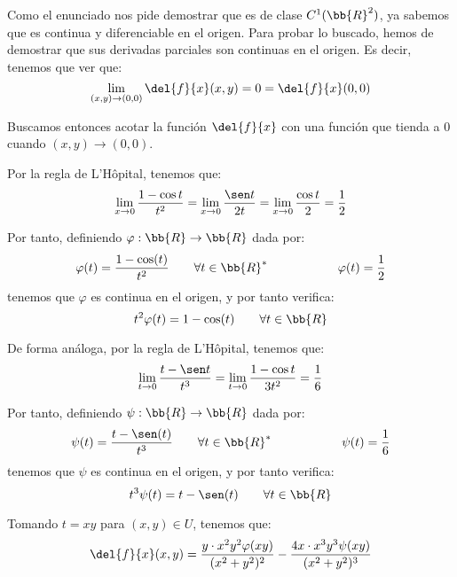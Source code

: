 \begin{ejercicio}
    Como el enunciado nos pide demostrar que es de clase $C^1(\bb{R}^2)$, ya sabemos que es continua y diferenciable en el origen. Para probar lo buscado, hemos de demostrar que sus derivadas parciales son continuas en el origen. Es decir,
    tenemos que ver que:
    \begin{equation*}
        \lim_{(x,y)\to (0,0)} \del{f}{x}(x,y) = 0 = \del{f}{x}(0,0)
    \end{equation*}

    Buscamos entonces acotar la función $\del{f}{x}$ con una función que tienda a $0$ cuando $(x,y)\to (0,0)$.

    Por la regla de L'Hôpital, tenemos que:
    \begin{equation*}
        \lim_{x\to 0} \frac{1-\cos t}{t^2}
        = \lim_{x\to 0} \frac{\sen t}{2t}
        = \lim_{x\to 0} \frac{\cos t}{2} = \frac{1}{2}
    \end{equation*}

    Por tanto, definiendo $\varphi:\bb{R} \to \bb{R}$ dada por:
    \begin{equation*}
        \varphi(t) = \frac{1-\cos(t)}{t^2} \qquad \forall t\in \bb{R}^\ast \hspace{2cm} \varphi(t) = \frac{1}{2}
    \end{equation*}
    tenemos que $\varphi$ es continua en el origen, y por tanto verifica:
    \begin{equation*}
        t^2\varphi(t) = 1-\cos(t) \qquad \forall t\in \bb{R}
    \end{equation*}

    De forma análoga, por la regla de L'Hôpital, tenemos que:
    \begin{equation*}
        \lim_{t\to 0} \frac{t-\sen t}{t^3}
        = \lim_{t\to 0} \frac{1-\cos t}{3t^2} = \frac{1}{6}
    \end{equation*}

    Por tanto, definiendo $\psi:\bb{R} \to \bb{R}$ dada por:
    \begin{equation*}
        \psi(t) = \frac{t-\sen(t)}{t^3} \qquad \forall t\in \bb{R}^\ast \hspace{2cm} \psi(t) = \frac{1}{6}
    \end{equation*}
    tenemos que $\psi$ es continua en el origen, y por tanto verifica:
    \begin{equation*}
        t^3\psi(t) = t-\sen(t) \qquad \forall t\in \bb{R}
    \end{equation*}

    Tomando $t=xy$ para $(x,y)\in U$, tenemos que:
    \begin{equation*}
        \del{f}{x}(x,y)
        = \frac{y\cdot x^2y^2\varphi(xy)}{(x^2+y^2)^2}
        - \frac{4x\cdot x^3y^3\psi(xy)}{(x^2+y^2)^3}
    \end{equation*}


\end{ejercicio}
